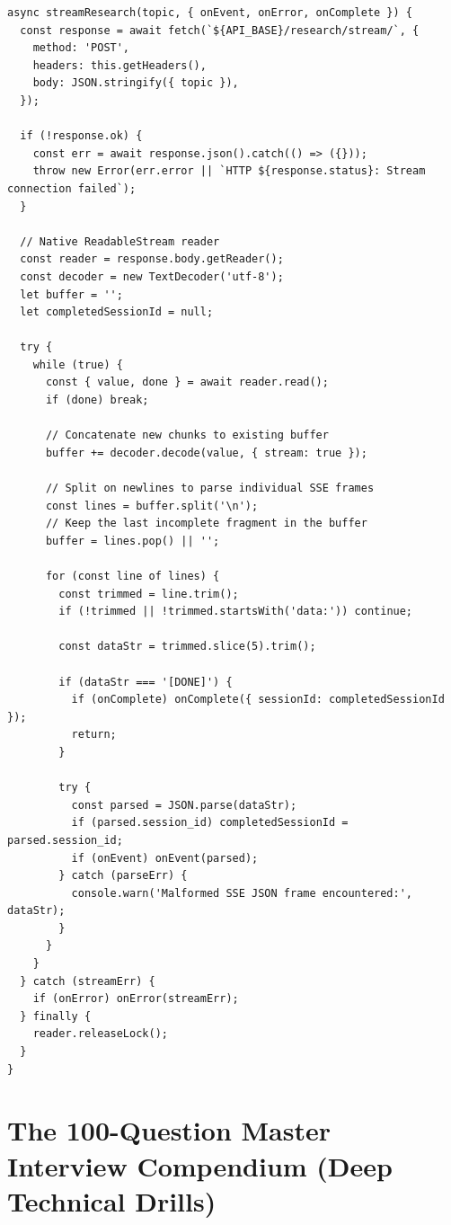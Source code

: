 \documentclass[11pt,a4paper,twoside]{report}
\begin{document}
\begin{lstlisting}[style=jsstyle,caption={Frontend SSE Stream Processor (api.js)}]
async streamResearch(topic, { onEvent, onError, onComplete }) {
  const response = await fetch(`${API_BASE}/research/stream/`, {
    method: 'POST',
    headers: this.getHeaders(),
    body: JSON.stringify({ topic }),
  });

  if (!response.ok) {
    const err = await response.json().catch(() => ({}));
    throw new Error(err.error || `HTTP ${response.status}: Stream connection failed`);
  }

  // Native ReadableStream reader
  const reader = response.body.getReader();
  const decoder = new TextDecoder('utf-8');
  let buffer = '';
  let completedSessionId = null;

  try {
    while (true) {
      const { value, done } = await reader.read();
      if (done) break;

      // Concatenate new chunks to existing buffer
      buffer += decoder.decode(value, { stream: true });

      // Split on newlines to parse individual SSE frames
      const lines = buffer.split('\n');
      // Keep the last incomplete fragment in the buffer
      buffer = lines.pop() || '';

      for (const line of lines) {
        const trimmed = line.trim();
        if (!trimmed || !trimmed.startsWith('data:')) continue;

        const dataStr = trimmed.slice(5).trim();

        if (dataStr === '[DONE]') {
          if (onComplete) onComplete({ sessionId: completedSessionId });
          return;
        }

        try {
          const parsed = JSON.parse(dataStr);
          if (parsed.session_id) completedSessionId = parsed.session_id;
          if (onEvent) onEvent(parsed);
        } catch (parseErr) {
          console.warn('Malformed SSE JSON frame encountered:', dataStr);
        }
      }
    }
  } catch (streamErr) {
    if (onError) onError(streamErr);
  } finally {
    reader.releaseLock();
  }
}
\end{lstlisting}



\chapter{The 100-Question Master Interview Compendium (Deep Technical Drills)}
\end{document}
